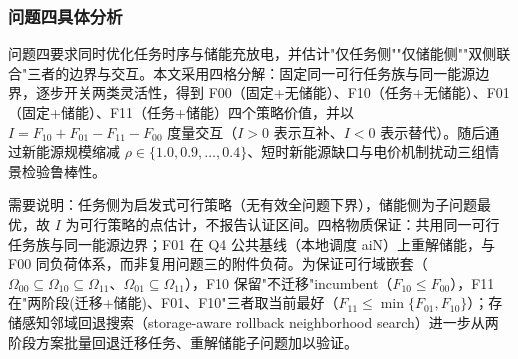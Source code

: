 \subsubsection{问题四具体分析}

问题四要求同时优化任务时序与储能充放电，并估计"仅任务侧""仅储能侧""双侧联合"三者的边界与交互。本文采用四格分解：固定同一可行任务族与同一能源边界，逐步开关两类灵活性，得到 F00（固定+无储能）、F10（任务+无储能）、F01（固定+储能）、F11（任务+储能）四个策略价值，并以 $I=F_{10}+F_{01}-F_{11}-F_{00}$ 度量交互（$I>0$ 表示互补、$I<0$ 表示替代）。随后通过新能源规模缩减 $\rho\in\{1.0,0.9,\dots,0.4\}$、短时新能源缺口与电价机制扰动三组情景检验鲁棒性。

需要说明：任务侧为启发式可行策略（无有效全问题下界），储能侧为子问题最优，故 $I$ 为可行策略的点估计，不报告认证区间。四格物质保证：共用同一可行任务族与同一能源边界；F01 在 Q4 公共基线（本地调度 aiN）上重解储能，与 F00 同负荷体系，而非复用问题三的附件负荷。为保证可行域嵌套（$\Omega_{00}\subseteq\Omega_{10}\subseteq\Omega_{11}$、$\Omega_{01}\subseteq\Omega_{11}$），F10 保留"不迁移"incumbent（$F_{10}\le F_{00}$），F11 在"两阶段(迁移+储能)、F01、F10"三者取当前最好（$F_{11}\le\min\{F_{01},F_{10}\}$）；存储感知邻域回退搜索\cite{pisinger2010lns}（storage-aware rollback neighborhood search）进一步从两阶段方案批量回退迁移任务、重解储能子问题加以验证。
